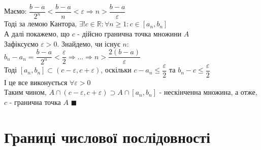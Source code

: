 \documentclass[a4paper, 14pt]{extarticle}
\def\qed{$\blacksquare$}
\begin{document}
	Маємо: $\dfrac{b-a}{2^n} < \dfrac{b-a}{n} < \varepsilon \Rightarrow n > \dfrac{b-a}{\varepsilon}$\\
	Тоді за лемою Кантора, $\exists! c \in \mathbb{R}: \forall n \geq 1: c \in [a_n,b_n]$\\
	А далі покажемо, що $c$ - дійсно гранична точка множини $A$\\
	Зафіксуємо $\varepsilon > 0$. Знайдемо, чи існує $n$: $b_n - a_n = \dfrac{b-a}{2^n} < \dfrac{\varepsilon}{2} \Rightarrow \dots \Rightarrow n > \dfrac{2(b-a)}{\varepsilon}$\\
	Тоді $[a_n,b_n] \subset (c-\varepsilon, c+\varepsilon)$, оскільки $c-a_n \leq \dfrac{\varepsilon}{2}$ та $b_n -c \leq \dfrac{\varepsilon}{2}$\\
	І це все виконується $\forall \varepsilon > 0$\\
	Таким чином, $A \cap (c-\varepsilon, c+\varepsilon) \supset A \cap [a_n,b_n]$ - нескінченна множина, а отже, $c$ - гранична точка $A$ \qed
	\newpage
	
	
	\section{Границі числової послідовності}
\end{document}
